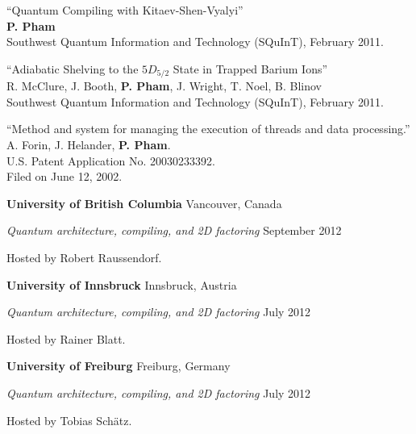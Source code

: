 \documentclass[letter]{article}
\begin{document}
\vspace{\baselineskip}
\par
``Quantum Compiling with Kitaev-Shen-Vyalyi''\\
\textbf{P. Pham}\\
Southwest Quantum Information and Technology (SQuInT), February 2011.

\vspace{\baselineskip}
\par
``Adiabatic Shelving to the $5D_{5/2}$ State in Trapped Barium Ions''\\
R. McClure, J. Booth, \textbf{P. Pham}, J. Wright, T. Noel, B. Blinov\\
Southwest Quantum Information and Technology (SQuInT), February 2011.

\vspace{\baselineskip}

``Method and system for managing the execution of threads and data processing.''
\\
A. Forin, J. Helander, \textbf{P. Pham}.\\
U.S. Patent Application No. 20030233392.\\
Filed on June 12, 2002.

\pagebreak

\vspace{\baselineskip}
\par
{\bf {University of British Columbia}} \hfill Vancouver, Canada
\par
{\em Quantum architecture, compiling, and 2D factoring} \hfill September 2012
\par
Hosted by Robert Raussendorf.

\vspace{\baselineskip}
\par
{\bf {University of Innsbruck}} \hfill Innsbruck, Austria
\par
{\em Quantum architecture, compiling, and 2D factoring} \hfill July 2012
\par
Hosted by Rainer Blatt.

\vspace{\baselineskip}
\par
{\bf {University of Freiburg}} \hfill Freiburg, Germany
\par
{\em Quantum architecture, compiling, and 2D factoring} \hfill July 2012
\par
Hosted by Tobias Sch\"atz.
\end{document}
